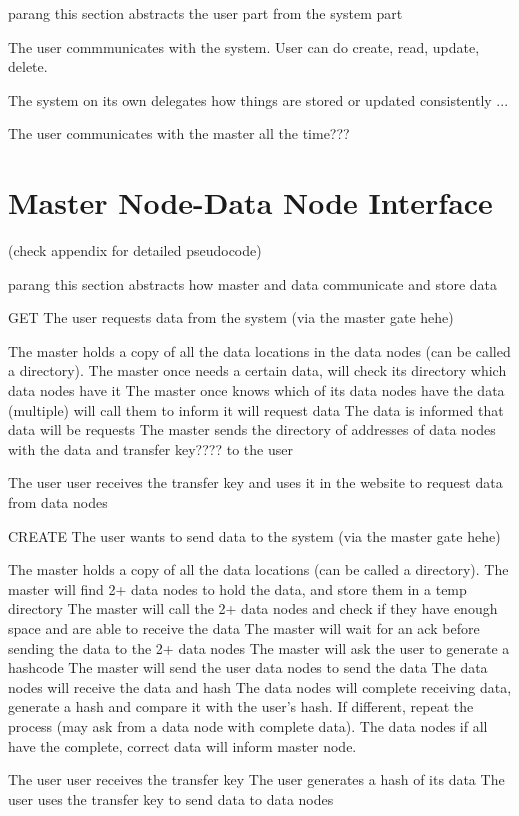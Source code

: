 \documentclass[acmsmall]{acmart}
\begin{document}
parang this section abstracts the user part from the system part

The user commmunicates with the system. User can do create, read, update, delete.

The system on its own delegates how things are stored or updated consistently ...

The user communicates with the master all the time???


\section{Master Node-Data Node Interface}
(check appendix for detailed pseudocode)

parang this section abstracts how master and data communicate and store data

GET
The user requests data from the system (via the master gate hehe)

The master holds a copy of all the data locations in the data nodes (can be called a directory). 
The master once needs a certain data, will check its directory which data nodes have it
The master once knows which of its data nodes have the data (multiple) will call them to inform it will request data
The data is informed that data will be requests
The master sends the directory of addresses of data nodes with the data and transfer key???? to the user

The user user receives the transfer key and uses it in the website to request data from data nodes

CREATE
The user wants to send data to the system (via the master gate hehe)

The master holds a copy of all the data locations (can be called a directory). 
The master will find 2+ data nodes to hold the data, and store them in a temp directory
The master will call the 2+ data nodes and check if they have enough space and are able to receive the data
The master will wait for an ack before sending the data to the 2+ data nodes
The master will ask the user to generate a hashcode
The master will send the user data nodes to send the data
The data nodes will receive the data and hash
The data nodes will complete receiving data, generate a hash and compare it with the user's hash. If different, repeat the process (may ask from a data node with complete data).
The data nodes if all have the complete, correct data will inform master node.

The user user receives the transfer key 
The user generates a hash of its data
The user uses the transfer key to send data to data nodes
\end{document}
